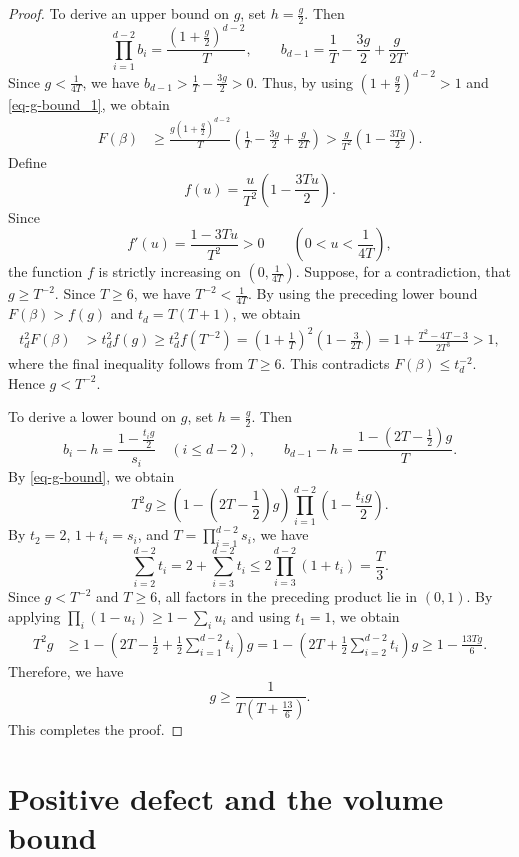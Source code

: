 \documentclass[reqno, 11pt]{article}
\numberwithin{equation}{section}
\theoremstyle{definition}
\begin{document}
\begin{proof}
To derive an upper bound on $g$, set $h=\frac{g}{2}$. Then
\[
\prod_{i=1}^{d-2}b_i=\frac{(1+\frac{g}{2})^{d-2}}{T},
\qquad
b_{d-1}=\frac1T-\frac{3g}{2}+\frac{g}{2T}.
\]
Since $g<\frac{1}{4T}$, we have $b_{d-1}>\frac{1}{T}-\frac{3g}{2}>0$. Thus, by using $(1+\frac{g}{2})^{d-2}>1$ and \eqref{eq-g-bound_1}, we obtain
\[
\begin{aligned}
F(\beta)
&\ge\frac{g(1+\frac{g}{2})^{d-2}}{T}
\left(\frac1T-\frac{3g}{2}+\frac{g}{2T}\right)>\frac{g}{T^2}\left(1-\frac{3Tg}{2}\right).
\end{aligned}
\]
Define
\[
f(u)=\frac{u}{T^2}\left(1-\frac{3Tu}{2}\right).
\]
Since
\[
f'(u)=\frac{1-3Tu}{T^2}>0
\qquad\left(0<u<\frac1{4T}\right),
\]
the function $f$ is strictly increasing on $\left(0,\frac{1}{4T}\right)$. Suppose, for a contradiction, that $g\ge T^{-2}$. Since $T\ge6$, we have $T^{-2}<\frac{1}{4T}$. By using the preceding lower bound $F(\beta)>f(g)$ and $t_d=T(T+1)$, we obtain
\[
\begin{aligned}
t_d^2F(\beta)
&>t_d^2f(g)\ge t_d^2f(T^{-2})=\left(1+\frac1T\right)^2
\left(1-\frac3{2T}\right)=1+\frac{T^2-4T-3}{2T^3}>1,
\end{aligned}
\]
where the final inequality follows from $T\ge6$. This contradicts $F(\beta)\le t_d^{-2}$. Hence $g<T^{-2}$.

To derive a lower bound on $g$, set $h=\frac{g}{2}$. Then
\[
b_i-h=\frac{1-\frac{t_i g}{2}}{s_i}\quad(i\le d-2),
\qquad
b_{d-1}-h=\frac{1-(2T-\frac12)g}{T}.
\]
By \eqref{eq-g-bound}, we obtain
\[
T^2g\ge
\left(1-\left(2T-\frac12\right)g\right)
\prod_{i=1}^{d-2}\left(1-\frac{t_i g}{2}\right).
\]
By $t_2=2$, $1+t_i=s_i$, and $T=\prod_{i=1}^{d-2}s_i$, we have
$$
\sum_{i=2}^{d-2}t_i
=2+\sum_{i=3}^{d-2}t_i
\le2\prod_{i=3}^{d-2}(1+t_i)
=\frac T3.
$$
Since $g<T^{-2}$ and $T\ge6$, all factors in the preceding product lie in $(0,1)$. By applying $\prod_i(1-u_i)\ge1-\sum_i u_i$ and using $t_1=1$, we obtain
\[
\begin{aligned}
T^2g
&\ge1-\left(2T-\frac12+\frac12\sum_{i=1}^{d-2}t_i\right)g=1-\left(2T+\frac12\sum_{i=2}^{d-2}t_i\right)g\ge1-\frac{13Tg}{6}.
\end{aligned}
\]
Therefore, we have
\[
g\ge\frac1{T(T+\frac{13}{6})}.
\]
This completes the proof.
\end{proof}


\section{Positive defect and the volume bound}\label{sec:low-dimensional}
\end{document}
